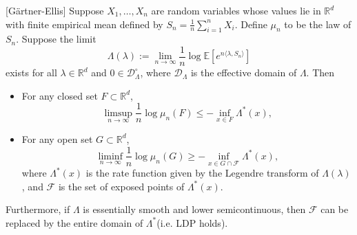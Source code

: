 \documentclass[10pt]{article}
\newenvironment{theorem*}[1]{%
  \IfBlankTF{#1}
    {\renewcommand{\themanualtheoreminner}{\unskip}}
    {\renewcommand\themanualtheoreminner{#1}}%
  \manualtheoreminner
}{\endmanualtheoreminner}
\theoremstyle{definition}
\begin{document}
\begin{theorem*}{}[Gärtner-Ellis]
    Suppose $X_1, \ldots, X_n$ are random variables whose values lie in $\mathbb{R}^d$ with finite empirical mean defined by $S_n = \frac{1}{n} \sum_{i=1}^n X_i$.
    Define $\mu_n$ to be the law of $S_n$.
    Suppose the limit
    \begin{equation*}
        \Lambda(\lambda) := \lim_{n \to \infty} \frac{1}{n} \log \mathbb{E}\left[e^{n \langle \lambda, S_n \rangle}\right]
    \end{equation*}
    exists for all $\lambda \in \mathbb{R}^d$ and $0 \in \mathcal{D}_\Lambda^\circ$, where $\mathcal{D}_\Lambda$ is the effective domain of $\Lambda$.
    Then
    \begin{itemize}
        \item For any closed set $F \subset \mathbb{R}^d$,
        \begin{equation*}
            \limsup_{n \to \infty} \frac{1}{n} \log \mu_n(F) \leq -\inf_{x \in F} \Lambda^*(x),
        \end{equation*}
        \item For any open set $G \subset \mathbb{R}^d$,
        \begin{equation*}
            \liminf_{n \to \infty} \frac{1}{n} \log \mu_n(G) \geq -\inf_{x \in G \cap \mathcal{F}} \Lambda^*(x),
        \end{equation*}
    where $\Lambda^*(x)$ is the rate function given by the Legendre transform of $\Lambda(\lambda)$, and $\mathcal{F}$ is the set of exposed points of $\Lambda^*(x)$.
    \end{itemize}
    Furthermore, if $\Lambda$ is essentially smooth and lower semicontinuous, then $\mathcal{F}$ can be replaced by the entire domain of $\Lambda^*$(i.e. LDP holds).
\end{theorem*}
\end{document}
